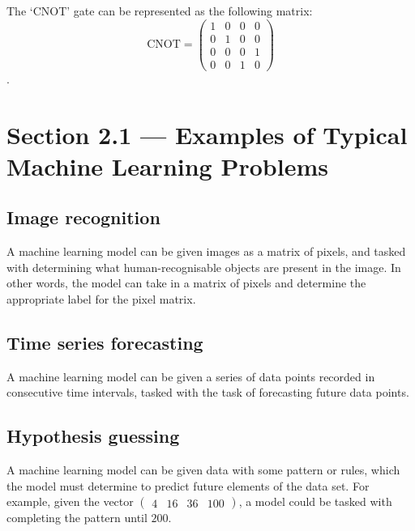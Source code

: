 \documentclass{article}
\theoremstyle{definition}
\begin{document}
The `CNOT' gate can be represented as the following matrix:\\
\[ \mathrm{CNOT} = \begin{pmatrix}
    1 & 0 & 0 & 0\\
    0 & 1 & 0 & 0\\
    0 & 0 & 0 & 1\\
    0 & 0 & 1 & 0
\end{pmatrix} \].

\section{Section 2.1 --- Examples of Typical Machine Learning Problems}

\subsection{Image recognition}
A machine learning model can be given images as a matrix of pixels, and tasked with determining what human-recognisable objects are present in the image. In other words, the model can take in a matrix of pixels and determine the appropriate label for the pixel matrix.

\subsection{Time series forecasting}
A machine learning model can be given a series of data points recorded in consecutive time intervals, tasked with the task of forecasting future data points.

\subsection{Hypothesis guessing}
A machine learning model can be given data with some pattern or rules, which the model must determine to predict future elements of the data set. For example, given the vector $\begin{pmatrix}
    4 & 16 & 36 & 100
\end{pmatrix}$, a model could be tasked with completing the pattern until $200$.
\end{document}
